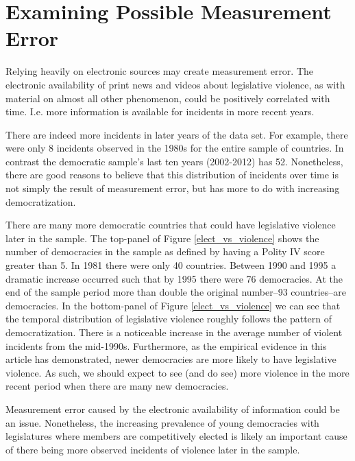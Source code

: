 \documentclass[a4paper]{article}\usepackage[]{graphicx}\usepackage[]{color}
\begin{document}
\section*{Examining Possible Measurement Error}


Relying heavily on electronic sources may create measurement error. The electronic availability of print news and videos about legislative violence, as with material on almost all other phenomenon, could be positively correlated with time. I.e. more information is available for incidents in more recent years.

There are indeed more incidents in later years of the data set. For example, there were only 8 incidents observed in the 1980s for the entire sample of countries. In contrast the democratic sample's last ten years (2002-2012) has 52. Nonetheless, there are good reasons to believe that this distribution of incidents over time is not simply the result of measurement error, but has more to do with increasing democratization.

There are many more democratic countries that could have legislative violence later in the sample. The top-panel of Figure \ref{elect_vs_violence} shows the number of democracies in the sample as defined by having a Polity IV score greater than 5. In 1981 there were only 40 countries. Between 1990 and 1995 a dramatic increase occurred such that by 1995 there were 76 democracies. At the end of the sample period more than double the original number--93 countries--are democracies. In the bottom-panel of Figure \ref{elect_vs_violence} we can see that the temporal distribution of legislative violence roughly follows the pattern of democratization. There is a noticeable increase in the average number of violent incidents from the mid-1990s. Furthermore, as the empirical evidence in this article has demonstrated, newer democracies are more likely to have legislative violence. As such, we should expect to see (and do see) more violence in the more recent period when there are many new democracies.

Measurement error caused by the electronic availability of information could be an issue. Nonetheless, the increasing prevalence of young democracies with legislatures where members are competitively elected is likely an important cause of there being more observed incidents of violence later in the sample.
\end{document}
